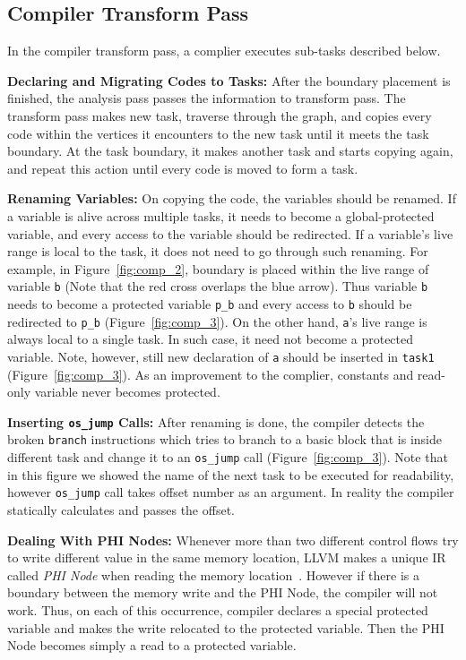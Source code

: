 \subsection{Compiler Transform Pass}
\label{sec:compiler_transform_pass}

In the compiler transform pass, a complier executes sub-tasks described below.

\textbf{Declaring and Migrating Codes to Tasks:} After the boundary placement is finished, the analysis pass passes the information to transform pass. The transform pass makes new task, traverse through the graph, and copies every code within the vertices it encounters to the new task until it meets the task boundary. At the task boundary, it makes another task and starts copying again, and repeat this action until every code is moved to form a task.

\textbf{Renaming Variables:} On copying the code, the variables should be renamed. If a variable is alive across multiple tasks, it needs to become a global-protected variable, and every access to the variable should be redirected. If a variable's live range is local to the task, it does not need to go through such renaming. For example, in Figure~\ref{fig:comp_2}, boundary is placed within the live range of variable {\tt b} (Note that the red cross overlaps the blue arrow). Thus variable {\tt b} needs to become a protected variable {\tt p\_b} and every access to {\tt b} should be redirected to {\tt p\_b} (Figure~\ref{fig:comp_3}). On the other hand, {\tt a}'s live range is always local to a single task. In such case, it need not become a protected variable. Note, however, still new declaration of {\tt a} should be inserted in {\tt task1} (Figure~\ref{fig:comp_3}). As an improvement to the complier, constants and read-only variable never becomes protected.

\textbf{Inserting \texttt{os\_jump} Calls:} After renaming is done, the compiler detects the broken {\tt branch} instructions which tries to branch to a basic block that is inside different task and change it to an {\tt os\_jump} call (Figure~\ref{fig:comp_3}).  Note that in this figure we showed the name of the next task to be executed for readability, however {\tt os\_jump} call takes offset number as an argument. In reality the compiler statically calculates and passes the offset.

\textbf{Dealing With PHI Nodes:} Whenever more than two different control flows try to write different value in the same memory location, LLVM makes a unique IR called {\em PHI Node} when reading the memory location~\cite{}. However if there is a boundary between the memory write and the PHI Node, the compiler will not work. Thus, on each of this occurrence, \sys compiler declares a special protected variable and makes the write relocated to the protected variable. Then the PHI Node becomes simply a read to a protected variable.

